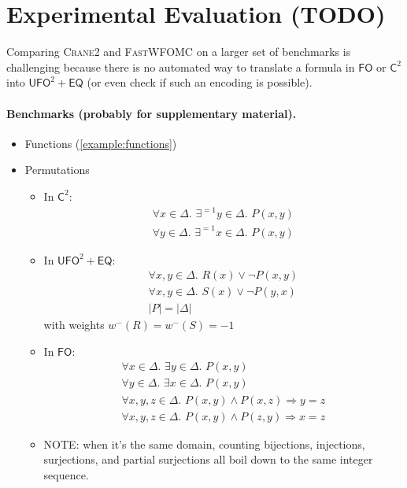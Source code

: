 \documentclass{article}
\theoremstyle{definition}
\newcommand{\Ctwo}{$\mathsf{C}^{2}$}
\newcommand{\FO}{$\mathsf{FO}$}
\newcommand{\UFO}{$\mathsf{UFO}^{2} + \mathsf{EQ}$}
\newcommand{\Cranetwo}{\textsc{Crane2}}
\begin{document}
\section{Experimental Evaluation (TODO)}

Comparing \Cranetwo{} and \textsc{FastWFOMC} on a larger set of benchmarks is
challenging because there is no automated way to translate a formula in \FO{} or
\Ctwo{} into \UFO{} (or even check if such an encoding is possible).

\paragraph{Benchmarks (probably for supplementary material).}
\begin{itemize}
  \item Functions (\cref{example:functions})
  \item Permutations
        \begin{itemize}
          \item In \Ctwo:
                \begin{gather*}
                  \forall x \in \Delta\text{. }\exists^{=1} y \in \Delta\text{. }P(x, y)\\
                  \forall y \in \Delta\text{. }\exists^{=1} x \in \Delta\text{. }P(x, y)
                \end{gather*}
          \item In \UFO:
                \begin{gather*}
                  \forall x, y \in \Delta\text{. }R(x) \lor \neg P(x, y)\\
                  \forall x, y \in \Delta\text{. }S(x) \lor \neg P(y, x)\\
                  |P| = |\Delta|
                \end{gather*}
                with weights $w^{-}(R) = w^{-}(S) = -1$
          \item In \FO:
                \begin{gather*}
                  \forall x \in \Delta\text{. }\exists y \in \Delta\text{. }P(x, y)\\
                  \forall y \in \Delta\text{. }\exists x \in \Delta\text{. }P(x, y)\\
                  \forall x, y, z \in \Delta\text{. }P(x, y) \land P(x, z) \Rightarrow y = z\\
                  \forall x, y, z \in \Delta\text{. }P(x, y) \land P(z, y) \Rightarrow x = z
                \end{gather*}
          \item NOTE: when it's the same domain, counting bijections,
                injections, surjections, and partial surjections all boil down
                to the same integer sequence.
        \end{itemize}
\end{itemize}
\end{document}
